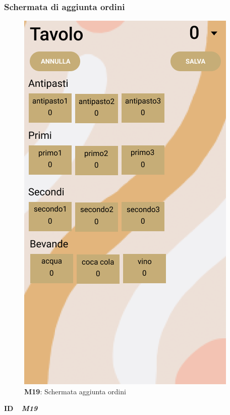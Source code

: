                     \subsubsection{Schermata di aggiunta ordini}
                          \begin{figure}[H]
                            \centering
                            \includegraphics[scale=0.4]{assets/diagrammi/Mockup/Mockup_AddOrder.png}
                            \caption*{\textbf{M19}: Schermata aggiunta ordini}\label{fig:Mockup_AddOrder}
                          \end{figure}
                
                          \begin{flushleft}
                            \textbf{ID}   \ \Large{ \emph{\textbf{M19}}}
                          \end{flushleft}
                
